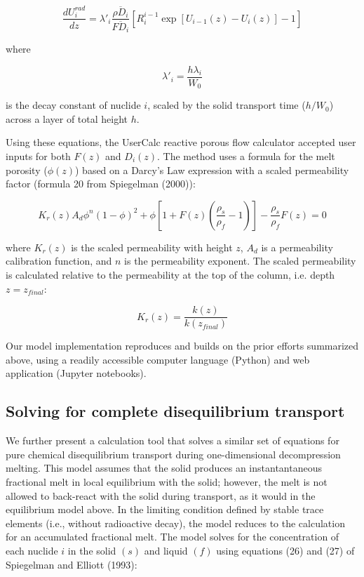 \documentclass[11pt]{article}
\begin{document}
\begin{equation}
    \frac{dU_i^{rad}}{dz} = \lambda'_i\frac{\overline{\rho D_{i}}}{\overline{F D_{i}}}\left[R_i^{i-1}\exp[U_{i-1}(z)-U_i(z)] - 1\right]\label{eq:17}
\end{equation}

where

\begin{equation}
    \lambda'_i = \frac{h\lambda_i}{W_0}\label{eq:18}
\end{equation}

is the decay constant of nuclide $i$, scaled by the solid transport time ($h/W_0$) across a layer of total height $h$.

Using these equations, the UserCalc reactive porous flow calculator accepted user inputs for both $F(z)$ and $D_i(z)$. The method uses a formula for the melt porosity ($\phi(z)$) based on a Darcy’s Law expression with a scaled permeability factor (formula 20 from Spiegelman (2000)):

\begin{equation}
    K_r(z)A_d \phi^n (1-\phi)^2 + \phi [1 + F(z) (\frac{\rho_s}{\rho_f} - 1)] - \frac{\rho_s}{\rho_f}F(z) = 0\label{eq:19}
\end{equation}

where $K_r(z)$ is the scaled permeability with height $z$, $A_d$ is a permeability calibration function, and $n$ is the permeability exponent. The scaled permeability is calculated relative to the permeability at the top of the column, i.e. depth $z=z_{final}$:

\begin{equation}
K_r(z) = \frac{k(z)}{k(z_{final})}\label{eq:20}
\end{equation}

Our model implementation reproduces and builds on the prior efforts summarized above, using a readily accessible computer language (Python) and web application (Jupyter notebooks).

    \hypertarget{solving-for-complete-disequilibrium-transport}{%
\subsection{Solving for complete disequilibrium transport}\label{solving-for-complete-disequilibrium-transport}}

We further present a calculation tool that solves a similar set of equations for pure chemical disequilibrium  transport during one-dimensional decompression melting. This model assumes that the solid produces an instantantaneous fractional melt in local equilibrium with the solid; however, the melt is not allowed to back-react with the solid during transport, as it would in the equilibrium model above. In the limiting condition defined by stable trace elements (i.e., without radioactive decay), the model reduces to the calculation for an accumulated fractional melt. The model solves for the concentration of each nuclide $i$ in the solid $(s)$ and liquid $(f)$ using equations (26) and (27) of Spiegelman and Elliott (1993):
\end{document}
